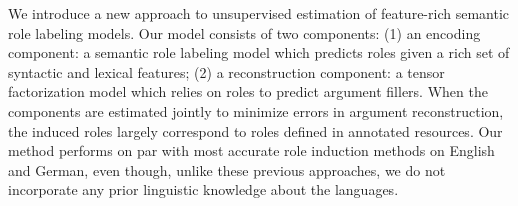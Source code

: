 We introduce a new approach to unsupervised estimation of feature-rich semantic role labeling models. Our model consists of two components: (1) an encoding component: a semantic role labeling model which predicts roles given a rich set of syntactic and lexical features; (2) a reconstruction component:  a tensor factorization model which relies on roles to predict argument fillers. When the components are estimated jointly to minimize errors in argument reconstruction,  the induced roles largely correspond to roles defined in annotated resources. Our method performs on par with most accurate  role induction methods on English and German, even though, unlike these previous approaches,  we do not incorporate any prior linguistic knowledge about the languages.
